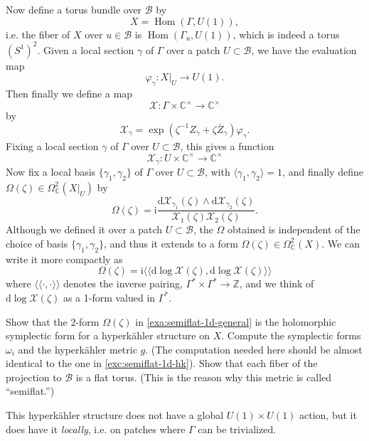 \documentclass[12pt,letterpaper,reqno]{article}
\numberwithin{equation}{section}
\newcommand{\cB}{\ensuremath{\mathcal B}}
\newcommand{\cX}{\ensuremath{\mathcal X}}
\newcommand{\C}{\ensuremath{\mathbb C}}
\newcommand{\Z}{\ensuremath{\mathbb Z}}
\newcommand{\hk}{hyperk\"ahler\xspace}
\newcommand{\I}{{\mathrm i}}
\newcommand{\de}{\mathrm{d}}
\newcommand{\IP}[1]{\langle#1\rangle}
\newcommand{\DIP}[1]{\langle\!\langle#1\rangle\!\rangle}
\newcommand{\ti}[1]{\textit{#1}}
\DeclareMathOperator{\Hom}{Hom}
\begin{document}
\begin{example}
Now define a torus bundle over $\cB$ by
\begin{equation}
  X = \Hom(\Gamma, U(1)),
\end{equation}
i.e. the fiber of $X$ over $u \in \cB$ is $\Hom(\Gamma_u, U(1))$,
which is indeed a torus $(S^1)^2$.
Given a local section $\gamma$ of $\Gamma$ over a patch
$U \subset \cB$, we have the evaluation map
\begin{equation}
  \varphi_\gamma: X \vert_U \to U(1).
\end{equation}
Then finally we define a map
\begin{equation}
  \cX: \Gamma \times \C^\times \to \C^\times
\end{equation}
by
\begin{equation}
  \cX_\gamma = \exp \left(\zeta^{-1} Z_\gamma + \zeta\bar{Z}_\gamma \right) \varphi_\gamma.
\end{equation}
Fixing a local section $\gamma$ of $\Gamma$ over $U \subset \cB$,
this gives a function
\begin{equation}
  \cX_\gamma: U \times \C^\times \to \C^\times
\end{equation}
Now fix a local basis $\{\gamma_1, \gamma_2\}$ of $\Gamma$
over $U \subset \cB$, with $\IP{\gamma_1,\gamma_2} = 1$,
and finally define $\Omega(\zeta) \in \Omega^2_\C(X\vert_U)$
by
\begin{equation}
  \Omega(\zeta) = \I \frac{\de \cX_{\gamma_1}(\zeta) \wedge \de \cX_{\gamma_2}(\zeta)}{\cX_1(\zeta) \cX_2(\zeta)}.
\end{equation}
Although we defined it over a patch $U \subset \cB$,
the $\Omega$ obtained is independent of the choice of
basis $\{\gamma_1,\gamma_2\}$, and thus it extends to a form
$\Omega(\zeta) \in \Omega^2_\C(X)$.
We can write it more compactly as
\begin{equation}
  \Omega(\zeta) = \I \DIP{\de \log \cX(\zeta), \de \log \cX(\zeta)}
\end{equation}
where $\DIP{\cdot,\cdot}$ denotes the inverse pairing,
$\Gamma^* \times \Gamma^* \to \Z$, and we think of
$\de \log \cX(\zeta)$ as a 1-form valued in $\Gamma^*$.
\end{example}

\begin{exercise} Show that the $2$-form $\Omega(\zeta)$ in
\autoref{exa:semiflat-1d-general} is the holomorphic symplectic
form for a \hk structure on $X$. Compute the symplectic forms
$\omega_i$ and the \hk metric $g$.
(The computation needed here should be almost 
identical to the one in \autoref{exc:semiflat-1d-hk}).
Show that each fiber of the 
projection to $\cB$ is a flat torus. (This is the reason why
this metric is called ``semiflat.'')
\end{exercise}
This \hk structure does
not have a global $U(1) \times U(1)$ action, but it does have
it \ti{locally}, i.e. on patches where $\Gamma$ can be trivialized.
\end{document}
